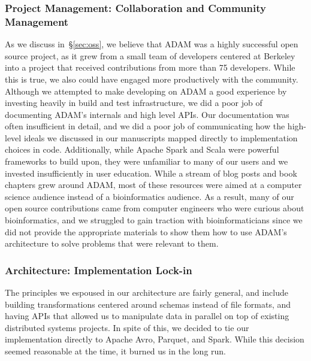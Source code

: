 \documentclass[phd]{ucbthesis}
\begin{document}
\subsubsection{Project Management: Collaboration and Community Management}
\label{sec:fail-collaborations-community}

As we discuss in~\S\ref{sec:oss}, we believe that ADAM was a highly successful
open source project, as it grew from a small team of developers centered at
Berkeley into a project that received contributions from more than 75
developers. While this is true, we also could have engaged more productively
with the community. Although we attempted to make developing on ADAM a good
experience by investing heavily in build and test infrastructure, we did a
poor job of documenting ADAM's internals and high level APIs. Our documentation
was often insufficient in detail, and we did a poor job of communicating how
the high-level ideals we discussed in our manuscripts mapped directly to
implementation choices in code. Additionally, while Apache Spark and Scala were
powerful frameworks to build upon, they were unfamiliar to many of our users
and we invested insufficiently in user education. While a stream of blog posts
and book chapters grew around ADAM, most of these resources were aimed at a
computer science audience instead of a bioinformatics audience. As a result,
many of our open source contributions came from computer engineers who were
curious about bioinformatics, and we struggled to gain traction with
bioinformaticians since we did not provide the appropriate materials to show
them how to use ADAM's architecture to solve problems that were relevant to
them.

\subsubsection{Architecture: Implementation Lock-in}
\label{sec:fail-lock-in}

The principles we espoused in our architecture are fairly general, and include
building transformations centered around schemas instead of file formats, and
having APIs that allowed us to manipulate data in parallel on top of existing
distributed systems projects. In spite of this, we decided to tie our
implementation directly to Apache Avro, Parquet, and Spark. While this decision
seemed reasonable at the time, it burned us in the long run.
\end{document}
